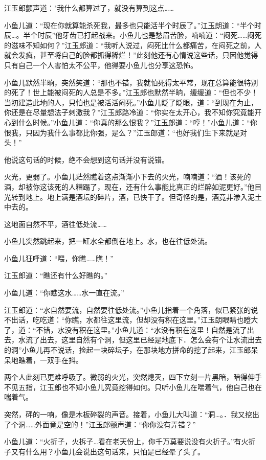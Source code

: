 \documentclass[12pt,oneside]{book}
\begin{document}
江玉郎颤声道："我什么都算过了，就没有算到这点\ldots\ldots{}

小鱼儿道：``现在你就算能杀死我，最多也只能活半个时辰了。''江玉朗道：``半个时辰\ldots。半个时辰''他牙齿已打起战来。小鱼儿也是愁眉苦脸，喃喃道：``闷死\ldots\ldots 闷死的滋味不知如何？''江玉郎道：``我听人说过，闷死比什么都痛苦，在闷死之前，人就会发疯，甚至将自己的脸都抓得稀烂！''此刻他还有心情说这些话，只因他觉得只有自己一个人害怕太不公平，他得要小鱼儿也分享这恐怖。

小鱼儿默然半晌，突然笑道：``那也不错，我就怕死得太平常，现在总算能很特别的死了！世上能被闷死的人总是不多。''江玉郎也默然半晌，缓缓道：``但也不少！当初建造此地的人，只怕也是被活活闷死。''小鱼儿眨了眨眼，道：``到现在为止，你还是在尽量想法子刺激我？''江玉郎路冷道：``你实在太开心，我不知你究竟能开心到什么时候。''小鱼儿道：``你真的那么恨我？''江玉郎道：``哼！''小鱼儿道：``你恨我，只因为我什么事都比你强，是么？''江玉郎道：``也好我们生下来就是对头！''

他说这句话的时候，绝不会想到这句话并没有说错。

火光，更弱了。小鱼儿茫然瞧着这点渐渐小下去的火光，喃喃道：``酒！该死的酒，却被你这该死的人糟蹋了，现在，还有什么事能比真正的烂醉如泥更好。''他目光转到地上。地上满是酒坛的碎片，酒，已快干了。但奇怪的是，酒竟非渗入泥土中去的。

这地面自然不平，酒往低处流\ldots\ldots{}

小鱼儿突然跳起来，把一缸水全都倒在地上。水，也在往低处流。

小鱼儿狂呼道：``喂，你瞧\ldots\ldots 瞧！''

江玉郎道：``瞧还有什么好瞧的。''

小鱼儿道：``你瞧这水\ldots\ldots 水一直在流。''

江玉郎道：``水自然要流，自然要往低处流。''小鱼儿指着一个角落，似已紧张的说不出话，吃吃道：``你瞧，水都往这里流，但却没有积在这里。''江玉朗眼睛也瞪大了，道：``不错，水没有积在这里。''小鱼儿道：``水没有积在这里！自然是流了出去，水流了出去，这里自然有个洞，但这里已经是地底下．怎么会有个让水流出去的洞''小鱼儿再不说话，捡起一块碎坛子，在那块地方拼命的挖了起来，江玉郎呆呆地瞧着，一双手在抖。

两个人此刻已更难呼吸了。微弱的火光，突然熄灭，四下立刻一片黑暗，暗得伸手不见五指，江玉郎也不知小鱼儿究竟挖得如何。只听小鱼儿在喘着气，他自己也在喘着气。

突然，砰的一响，像是木板碎裂的声音。接着，小鱼儿大叫道：``洞\ldots。．我又挖出了个洞\ldots\ldots 外面竟是空的！''江玉郎颤声道：``你你没有弄错？''

小鱼儿道：``火折子，火拆子\ldots 看在老天份上，你千万莫要说没有火折子。''有火折子又有什么用？小鱼儿会说出这句话来，只怕是已经晕了头了。
\end{document}
